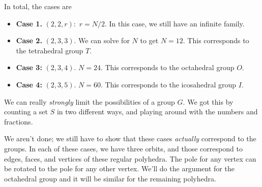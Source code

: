 In total, the cases are 
\begin{itemize}
    \item \textbf{Case 1.} $(2, 2, r):$ $r = N/2$. In this case, we still have an infinite family. 
    \item \textbf{Case 2.} $(2, 3, 3)$. We can solve for $N$ to get $N = 12.$ This corresponds to the tetrahedral group $T.$
    \item \textbf{Case 3:} $(2, 3, 4)$. $N = 24$. This corresponds to the octahedral group $O.$
    \item \textbf{Case 4:} $(2, 3, 5)$. $N = 60.$ This corresponds to the icosahedral group $I.$
\end{itemize}

We can really \emph{strongly} limit the possibilities of a group $G$. We got this by counting a set $S$ in two different ways, and playing around with the numbers and fractions. %

We aren't done; we still have to show that these cases \emph{actually} correspond to the groups. In each of these cases, we have three orbits, and those correspond to edges, faces, and vertices of these regular polyhedra. The pole for any vertex can be rotated to the pole for any other vertex. We'll do the argument for the octahedral group and it will be similar for the remaining polyhedra.

